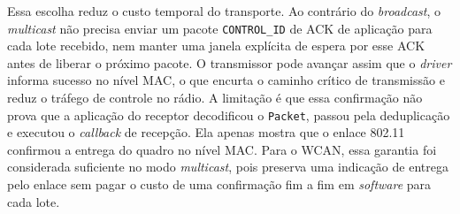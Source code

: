 Essa escolha reduz o custo temporal do transporte. Ao contrário do \emph{broadcast}, o
\emph{multicast} não precisa enviar um pacote \texttt{CONTROL\_ID} de ACK de aplicação
para cada lote recebido, nem manter uma janela explícita de espera por esse ACK
antes de liberar o próximo pacote. O transmissor pode avançar assim que o \emph{driver}
informa sucesso no nível MAC, o que encurta o caminho crítico de transmissão e
reduz o tráfego de controle no rádio. A limitação é que essa confirmação não prova
que a aplicação do receptor decodificou o \texttt{Packet}, passou pela
deduplicação e executou o \emph{callback} de recepção. Ela apenas mostra que o enlace
802.11 confirmou a entrega do quadro no nível MAC. Para o WCAN, essa garantia foi
considerada suficiente no modo \emph{multicast}, pois preserva uma indicação de entrega
pelo enlace sem pagar o custo de uma confirmação fim a fim em \emph{software} para cada
lote.
